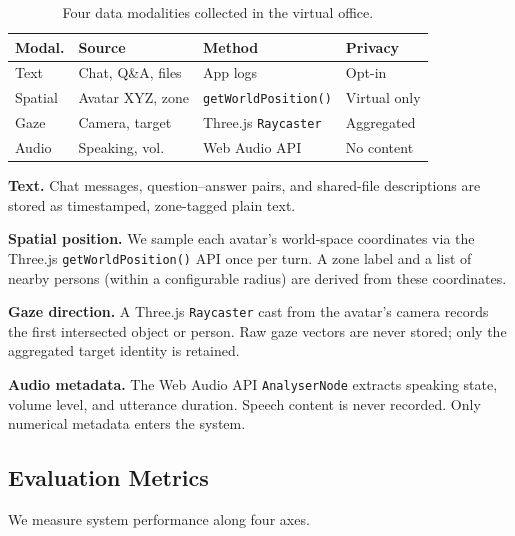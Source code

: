 \documentclass[journal]{IEEEtran}
\begin{document}
\begin{table}[t]
  \centering
  \caption{Four data modalities collected in the virtual office.}
  \label{tab:modalities}
  \footnotesize
  \begin{tabular}{@{}lp{1.5cm}p{1.8cm}p{1.4cm}@{}}
    \toprule
    \textbf{Modal.} & \textbf{Source} & \textbf{Method} & \textbf{Privacy} \\
    \midrule
    Text & Chat, Q\&A, files & App logs & Opt-in \\
    Spatial & Avatar XYZ, zone & \texttt{getWorld\-Position()} & Virtual only \\
    Gaze & Camera, target & Three.js \texttt{Ray\-caster} & Aggregated \\
    Audio & Speaking, vol. & Web Audio API & No content \\
    \bottomrule
  \end{tabular}
\end{table}

\noindent
\textbf{Text.}\;
Chat messages, question--answer pairs, and shared-file descriptions
are stored as timestamped, zone-tagged plain text.

\noindent
\textbf{Spatial position.}\;
We sample each avatar's world-space coordinates via the Three.js
\texttt{getWorldPosition()} API once per turn.  A zone label and a
list of nearby persons (within a configurable radius) are derived from
these coordinates.

\noindent
\textbf{Gaze direction.}\;
A Three.js \texttt{Raycaster} cast from the avatar's camera records
the first intersected object or person.  Raw gaze vectors are never
stored; only the aggregated target identity is retained.

\noindent
\textbf{Audio metadata.}\;
The Web Audio API \texttt{AnalyserNode} extracts speaking state,
volume level, and utterance duration.  Speech content is never
recorded.  Only numerical metadata enters the system.

\subsection{Evaluation Metrics}
\label{ssec:metrics}

We measure system performance along four axes.
\end{document}
